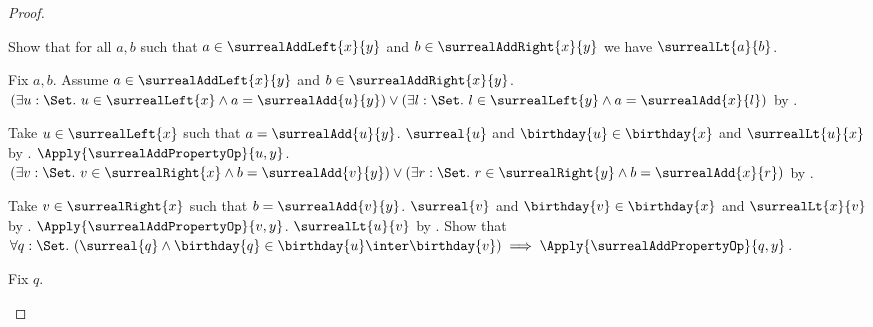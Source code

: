 \begin{proof}
\begin{subproof}
        Show that for all $a,b$ such that
            $a\in\surrealAddLeft{x}{y}$ and
            $b\in\surrealAddRight{x}{y}$ we have $\surrealLt{a}{b}$.
        \begin{subproof}
            Fix $a,b$.
            Assume $a\in\surrealAddLeft{x}{y}$ and
                $b\in\surrealAddRight{x}{y}$.
            $(\exists u:\Set.\ u\in\surrealLeft{x}\land
                    a=\surrealAdd{u}{y})
                \lor
                (\exists l:\Set.\ l\in\surrealLeft{y}\land
                    a=\surrealAdd{x}{l})$
                by .
            \begin{byCase}
                    Take $u\in\surrealLeft{x}$ such that
                        $a=\surrealAdd{u}{y}$.
                    $\surreal{u}$ and
                        $\birthday{u}\in\birthday{x}$ and
                        $\surrealLt{u}{x}$
                        by .
                    $\Apply{\surrealAddPropertyOp}{u,y}$.
                    $(\exists v:\Set.\ v\in\surrealRight{x}\land
                            b=\surrealAdd{v}{y})
                        \lor
                        (\exists r:\Set.\ r\in\surrealRight{y}\land
                            b=\surrealAdd{x}{r})$
                        by .
                    \begin{byCase}
                            Take $v\in\surrealRight{x}$ such that
                                $b=\surrealAdd{v}{y}$.
                            $\surreal{v}$ and
                                $\birthday{v}\in\birthday{x}$ and
                                $\surrealLt{x}{v}$
                                by .
                            $\Apply{\surrealAddPropertyOp}{v,y}$.
                            $\surrealLt{u}{v}$
                                by .
                            Show that $\forall q:\Set.\ (\surreal{q}\land
                                \birthday{q}\in
                                    \birthday{u}\inter\birthday{v})
                                \implies
                                \Apply{\surrealAddPropertyOp}{q,y}$.
                            \begin{subproof}
                                Fix $q$.

\end{subproof}
\end{byCase}
\end{byCase}
\end{subproof}
\end{subproof}
\end{proof}
